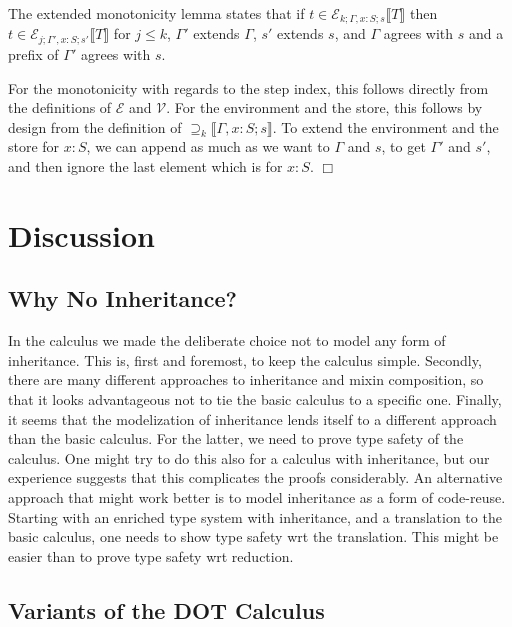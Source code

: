 \documentclass[9pt]{sigplanconf}
\newenvironment{proofsketch}{{\em Proof Sketch:}}{$\Box$}
\newcommand{\envplus}[1]{, #1}
\newcommand{\rele}[4]{\mathcal{E}_{#1;#2;#3}\llbracket#4\rrbracket}
\newcommand{\rels}[3]{\mathcal{\supseteq}_{#1}\llbracket#2;#3\rrbracket}
\begin{document}
The extended monotonicity lemma states that if $t \in \rele k {\Gamma
  \envplus{x : S}} s T$ then $t \in \rele j {\Gamma' \envplus{x : S}}
{s'} T$ for $j \leq k$, $\Gamma'$ extends $\Gamma$, $s'$
extends $s$, and $\Gamma$ agrees with $s$ and a prefix of $\Gamma'$
agrees with $s$.

\begin{proofsketch}
For the monotonicity with regards to the step index, this follows
directly from the definitions of $\mathcal{E}$ and $\mathcal{V}$. For
the environment and the store, this follows by design from the
definition of $\rels k {\Gamma \envplus{x : S}} s$. To extend the
environment and the store for $x : S$, we can append as much as we
want to $\Gamma$ and $s$, to get $\Gamma'$ and $s'$, and then ignore
the last element which is for $x : S$.
\end{proofsketch}

\section{Discussion}\label{discussion}

\subsection{Why No Inheritance?}\label{why-no-inheritance}

In the calculus we made the deliberate choice not to model any form of
inheritance. This is, first and foremost, to keep the calculus simple.
Secondly, there are many different approaches to inheritance and
mixin composition, so that it looks advantageous not to tie the basic
calculus to a specific one. Finally, it seems that the modelization of
inheritance lends itself to a different approach than the basic
calculus. For the latter, we need to prove type safety of the calculus.
One might try to do this also for a calculus with inheritance, but our
experience suggests that this complicates the proofs considerably.  An
alternative approach that might work better is to model inheritance
as a form of code-reuse. Starting with an enriched type system with
inheritance, and a translation to the basic calculus, one needs to
show type safety wrt the translation. This might be easier than
to prove type safety wrt reduction.

\subsection{Variants of the DOT Calculus}\label{dot-variants}
\end{document}
